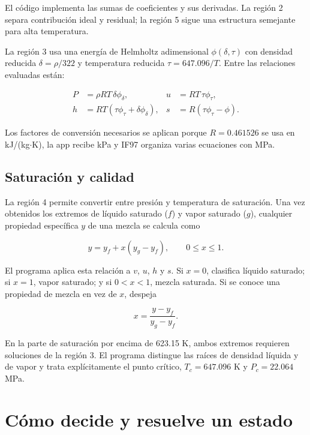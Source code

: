 \documentclass[11pt,a4paper,oneside]{article}
\begin{document}
El c\'odigo implementa las sumas de coeficientes y sus derivadas. La regi\'on 2 separa contribuci\'on ideal y residual; la regi\'on 5 sigue una estructura semejante para alta temperatura.

La regi\'on 3 usa una energ\'ia de Helmholtz adimensional $\phi(\delta,\tau)$ con densidad reducida $\delta=\rho/322$ y temperatura reducida $\tau=647.096/T$. Entre las relaciones evaluadas est\'an:

\begin{align}
P &= \rho RT\,\delta\phi_{\delta}, &
u &= RT\,\tau\phi_{\tau}, \\
h &= RT\left(\tau\phi_{\tau}+\delta\phi_{\delta}\right), &
s &= R\left(\tau\phi_{\tau}-\phi\right).
\end{align}

Los factores de conversi\'on necesarios se aplican porque $R=0.461526$ se usa en kJ/(kg$\cdot$K), la app recibe kPa y IF97 organiza varias ecuaciones con MPa.

\subsection{Saturaci\'on y calidad}

La regi\'on 4 permite convertir entre presi\'on y temperatura de saturaci\'on. Una vez obtenidos los extremos de l\'iquido saturado ($f$) y vapor saturado ($g$), cualquier propiedad espec\'ifica $y$ de una mezcla se calcula como

\begin{equation}
  y = y_f + x\left(y_g-y_f\right), \qquad 0\le x\le1.
\end{equation}

El programa aplica esta relaci\'on a $v$, $u$, $h$ y $s$. Si $x=0$, clasifica l\'iquido saturado; si $x=1$, vapor saturado; y si $0<x<1$, mezcla saturada. Si se conoce una propiedad de mezcla en vez de $x$, despeja

\begin{equation}
  x=\frac{y-y_f}{y_g-y_f}.
\end{equation}

En la parte de saturaci\'on por encima de 623.15 K, ambos extremos requieren soluciones de la regi\'on 3. El programa distingue las ra\'ices de densidad l\'iquida y de vapor y trata expl\'icitamente el punto cr\'itico, $T_c=647.096$ K y $P_c=22.064$ MPa.

\section{C\'omo decide y resuelve un estado}
\end{document}
